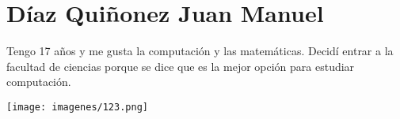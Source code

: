 \chapter{Díaz Quiñonez Juan Manuel}
Tengo 17 años y me gusta la computación y las matemáticas. Decidí entrar a la facultad de ciencias porque se dice que es la mejor opción para estudiar computación.
\date{ytoday}
\texttt{[image: imagenes/123.png]}

